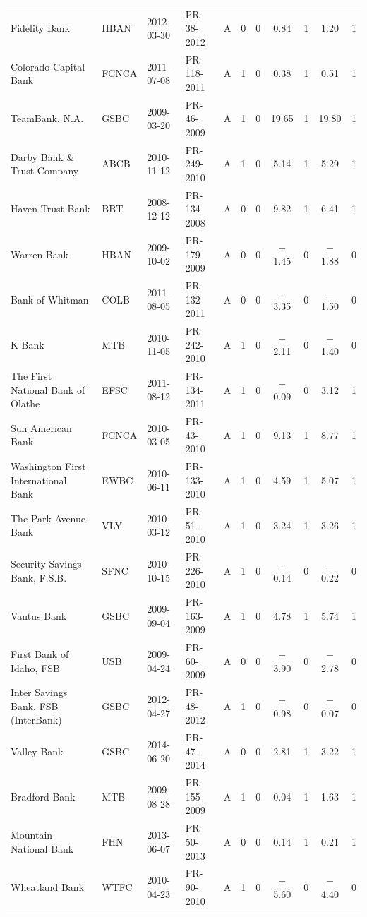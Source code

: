 \begin{table}[!t]
\begin{tabular*}{\textwidth}{@{\extracolsep{\fill}}llllccccccc}
Fidelity Bank & HBAN & 2012-03-30 & PR-38-2012 & A & 0 & 0 & 0.84 & 1 & 1.20 & 1 \\
Colorado Capital Bank & FCNCA & 2011-07-08 & PR-118-2011 & A & 1 & 0 & 0.38 & 1 & 0.51 & 1 \\
TeamBank, N.A. & GSBC & 2009-03-20 & PR-46-2009 & A & 1 & 0 & 19.65 & 1 & 19.80 & 1 \\
Darby Bank \& Trust Company & ABCB & 2010-11-12 & PR-249-2010 & A & 1 & 0 & 5.14 & 1 & 5.29 & 1 \\
Haven Trust Bank & BBT & 2008-12-12 & PR-134-2008 & A & 0 & 0 & 9.82 & 1 & 6.41 & 1 \\
Warren Bank & HBAN & 2009-10-02 & PR-179-2009 & A & 0 & 0 & $-$1.45 & 0 & $-$1.88 & 0 \\
Bank of Whitman & COLB & 2011-08-05 & PR-132-2011 & A & 0 & 0 & $-$3.35 & 0 & $-$1.50 & 0 \\
K Bank & MTB & 2010-11-05 & PR-242-2010 & A & 1 & 0 & $-$2.11 & 0 & $-$1.40 & 0 \\
The First National Bank of Olathe & EFSC & 2011-08-12 & PR-134-2011 & A & 1 & 0 & $-$0.09 & 0 & 3.12 & 1 \\
Sun American Bank & FCNCA & 2010-03-05 & PR-43-2010 & A & 1 & 0 & 9.13 & 1 & 8.77 & 1 \\
Washington First International Bank & EWBC & 2010-06-11 & PR-133-2010 & A & 1 & 0 & 4.59 & 1 & 5.07 & 1 \\
The Park Avenue Bank & VLY & 2010-03-12 & PR-51-2010 & A & 1 & 0 & 3.24 & 1 & 3.26 & 1 \\
Security Savings Bank, F.S.B. & SFNC & 2010-10-15 & PR-226-2010 & A & 1 & 0 & $-$0.14 & 0 & $-$0.22 & 0 \\
Vantus Bank & GSBC & 2009-09-04 & PR-163-2009 & A & 1 & 0 & 4.78 & 1 & 5.74 & 1 \\
First Bank of Idaho, FSB & USB & 2009-04-24 & PR-60-2009 & A & 0 & 0 & $-$3.90 & 0 & $-$2.78 & 0 \\
Inter Savings Bank, FSB (InterBank) & GSBC & 2012-04-27 & PR-48-2012 & A & 1 & 0 & $-$0.98 & 0 & $-$0.07 & 0 \\
Valley Bank & GSBC & 2014-06-20 & PR-47-2014 & A & 0 & 0 & 2.81 & 1 & 3.22 & 1 \\
Bradford Bank & MTB & 2009-08-28 & PR-155-2009 & A & 1 & 0 & 0.04 & 1 & 1.63 & 1 \\
Mountain National Bank & FHN & 2013-06-07 & PR-50-2013 & A & 0 & 0 & 0.14 & 1 & 0.21 & 1 \\
Wheatland Bank & WTFC & 2010-04-23 & PR-90-2010 & A & 1 & 0 & $-$5.60 & 0 & $-$4.40 & 0 \\

\end{tabular*}
\end{table}
